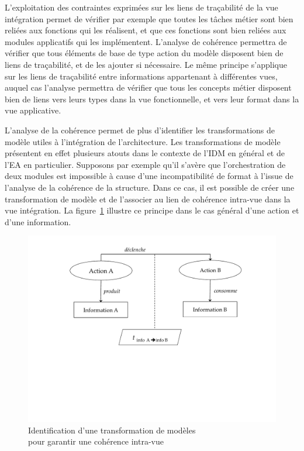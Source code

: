 L'exploitation des contraintes exprimées sur
les liens de traçabilité de la vue intégration  permet de vérifier par exemple 
que toutes les tâches métier sont bien reliées aux fonctions
qui les réalisent, et que ces fonctions sont bien reliées aux modules applicatifs qui les implémentent.
L'analyse de cohérence permettra de vérifier que tous éléments de base de type action du  modèle
disposent bien de liens de traçabilité, et de les ajouter si nécessaire. Le même principe s'applique sur les
liens de traçabilité entre informations appartenant à différentes vues, auquel cas l'analyse permettra de vérifier que tous
les concepts métier disposent bien de liens vers leurs types dans la vue fonctionnelle, et vers leur format
dans la vue applicative.

L'analyse de la cohérence permet de plus d'identifier les transformations de modèle utiles à l'intégration de l'architecture.
Les transformations de modèle présentent en effet plusieurs atouts dans le contexte de l'IDM en général
et de l'EA en particulier. Supposons par exemple qu'il s'avère que
l'orchestration de deux modules est impossible à cause d'une incompatibilité de format
à l'issue de l'analyse de la cohérence de la structure. Dans ce cas, il est possible de créer une transformation
de modèle et de l'associer au lien de cohérence intra-vue dans la vue intégration. La figure~\ref{fig:transfo_coherence}
illustre ce principe dans le cas général d'une action et d'une information.

\begin{figure}[!ht]
 \centering
 \includegraphics[trim= 0cm 7.5cm 0cm 0cm, clip, width=1\textwidth]{figures/4_demarche/transfo_coherence.pdf}
 \caption{Identification d'une transformation de modèles \\
          pour garantir une cohérence intra-vue}
 \label{fig:transfo_coherence}
\end{figure}

